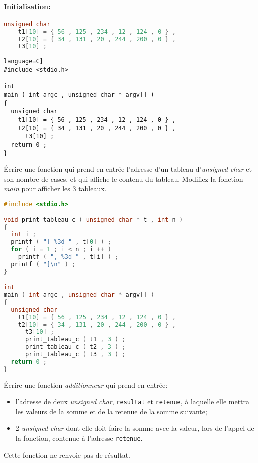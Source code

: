 \paragraph{Initialisation:} 
\begin{lstlisting}[language=C]
unsigned char
    t1[10] = { 56 , 125 , 234 , 12 , 124 , 0 } ,
    t2[10] = { 34 , 131 , 20 , 244 , 200 , 0 } ,
    t3[10] ;
\end{lstlisting}
\begin{solution}
  \begin{lstlisting}language=C]
#include <stdio.h>

int
main ( int argc , unsigned char * argv[] )
{
  unsigned char
    t1[10] = { 56 , 125 , 234 , 12 , 124 , 0 } ,
    t2[10] = { 34 , 131 , 20 , 244 , 200 , 0 } ,
      t3[10] ;
  return 0 ;
}
  \end{lstlisting}
\end{solution}

\question Écrire une fonction qui prend en entrée l'adresse d'un tableau d'\emph{unsigned char} et son nombre de cases, et qui affiche le contenu du tableau. Modifiez la fonction 
\emph{main} pour afficher les 3 tableaux.
\begin{solution}
  \begin{lstlisting}[language=C]
#include <stdio.h>

void print_tableau_c ( unsigned char * t , int n )
{
  int i ;
  printf ( "[ %3d " , t[0] ) ;
  for ( i = 1 ; i < n ; i ++ )
    printf ( ", %3d " , t[i] ) ;
  printf ( "]\n" ) ;
}

int
main ( int argc , unsigned char * argv[] )
{
  unsigned char
    t1[10] = { 56 , 125 , 234 , 12 , 124 , 0 } ,
    t2[10] = { 34 , 131 , 20 , 244 , 200 , 0 } ,
      t3[10] ;
      print_tableau_c ( t1 , 3 ) ;
      print_tableau_c ( t2 , 3 ) ;
      print_tableau_c ( t3 , 3 ) ;
  return 0 ;
}    
  \end{lstlisting}
\end{solution}

\question Écrire une fonction \emph{additionneur} qui prend en entrée:
\begin{itemize}
\item l'adresse de deux \emph{unsigned char}, \texttt{resultat} et
  \texttt{retenue}, à laquelle elle mettra les valeurs de la somme et
  de la retenue de la somme suivante;
\item 2 \emph{unsigned char} dont elle doit faire la somme avec la valeur, lors
  de l'appel de la fonction, contenue à l'adresse \texttt{retenue}.
\end{itemize}
Cette fonction ne renvoie pas de résultat.

